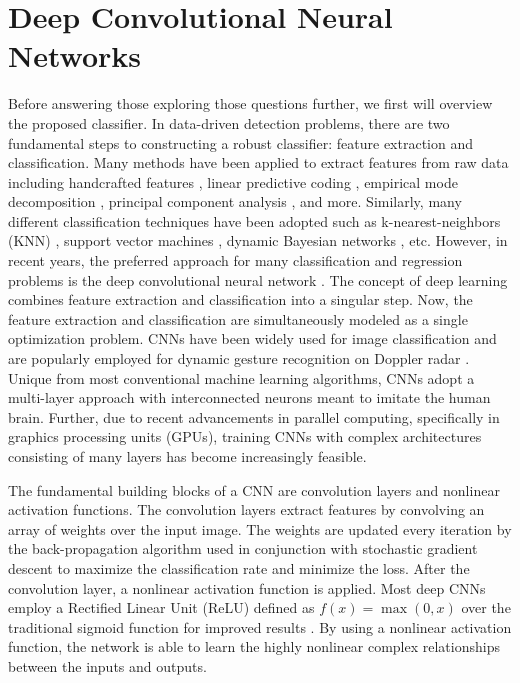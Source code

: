 \documentclass{ieeeaccess}
\begin{document}
\section{Deep Convolutional Neural Networks}
\label{sec:dcnn}
Before answering those exploring those questions further, we first will overview the proposed classifier. In data-driven detection problems, there are two fundamental steps to constructing a robust classifier: feature extraction and classification. Many methods have been applied to extract features from raw data including handcrafted features \cite{dynamic_gesture_recognition:svm,hand_crafted_features}, linear predictive coding \cite{linear_predictive_coding}, empirical mode decomposition \cite{empirical_mode_decomposition}, principal component analysis \cite{principal_component_analysis}, and more. Similarly, many different classification techniques have been adopted such as k-nearest-neighbors (KNN) \cite{KNN}, support vector machines \cite{dynamic_gesture_recognition:svm,static_gesture_recognition:time_domain}, dynamic Bayesian networks \cite{dynamic_bayesian_networks}, etc. 
However, in recent years, the preferred approach for many classification and regression problems is the deep convolutional neural network \cite{dynamic_gesture_recognition:micro_doppler}. The concept of deep learning combines feature extraction and classification into a singular step. Now, the feature extraction and classification are simultaneously modeled as a single optimization problem. CNNs have been widely used for image classification and are popularly employed for dynamic gesture recognition on Doppler radar \cite{dynamic_gesture_recognition:low_power,dynamic_gesture_recognition:application_of_Dopper_DCNN}. Unique from most conventional machine learning algorithms, CNNs adopt a multi-layer approach with interconnected neurons meant to imitate the human brain. Further, due to recent advancements in parallel computing, specifically in graphics processing units (GPUs), training CNNs with complex architectures consisting of many layers has become increasingly feasible. 

The fundamental building blocks of a CNN are convolution layers and nonlinear activation functions. The convolution layers extract features by convolving an array of weights over the input image. The weights are updated every iteration by the back-propagation algorithm used in conjunction with stochastic gradient descent to maximize the classification rate and minimize the loss. After the convolution layer, a nonlinear activation function is applied. Most deep CNNs employ a Rectified Linear Unit (ReLU) defined as $f(x) = \max(0,x)$ over the traditional sigmoid function for improved results \cite{ReLU}. By using a nonlinear activation function, the network is able to learn the highly nonlinear complex relationships between the inputs and outputs. 
\end{document}
